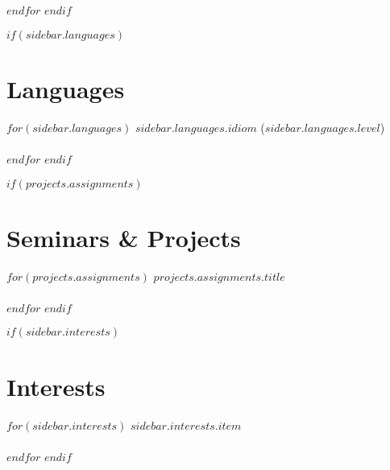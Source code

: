 \documentclass[$fontsize$, a4paper]{article}
\begin{document}
$endfor$
$endif$



$if(sidebar.languages)$
\section*{Languages}
$for(sidebar.languages)$
\emph{$sidebar.languages.idiom$} ($sidebar.languages.level$)\\~\\
$endfor$
$endif$

$if(projects.assignments)$
\section*{Seminars \& Projects} 
$for(projects.assignments)$
\href{http://andreasgeorgiou.github.io/onlinecv/$projects.assignments.link$}{$projects.assignments.title$}\\~\\
 
$endfor$
$endif$

$if(sidebar.interests)$
\section*{Interests}
$for(sidebar.interests)$
{$sidebar.interests.item$}\\~\\
$endfor$
$endif$
\end{document}
